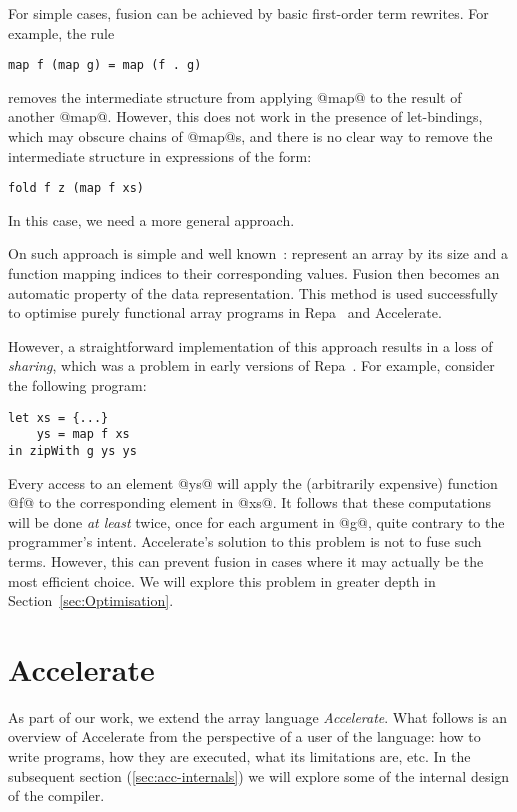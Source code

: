 For simple cases, fusion can be achieved by basic first-order term rewrites. For example, the rule
%
\begin{lstlisting}
map f (map g) = map (f . g)
\end{lstlisting}
%
removes the intermediate structure from applying @map@ to the result of another @map@. However, this does not work in the presence of let-bindings, which may obscure chains of @map@s, and there is no clear way to remove the intermediate structure in expressions of the form:
%
\begin{lstlisting}
fold f z (map f xs)
\end{lstlisting}
%
In this case, we need a more general approach.

On such approach is simple and well known~\cite{Claessen:obsidian-expressive,Guibas:1978jh,Elliott:2003ug}: represent an array by its size and a function mapping indices to their corresponding values. Fusion then becomes an automatic property of the data representation. This method is used successfully to optimise purely functional array programs in Repa~\cite{Keller:Repa,Lippmeier:Guiding} and Accelerate.

However, a straightforward implementation of this approach results in a loss of \emph{sharing}, which was a problem in early versions of Repa~\cite{Lippmeier:Guiding}. For example, consider the following program:
%
\begin{lstlisting}
let xs = {...}
    ys = map f xs
in zipWith g ys ys
\end{lstlisting}
%
Every access to an element @ys@ will apply the (arbitrarily expensive) function @f@ to the corresponding element in @xs@. It follows that these computations will be done \emph{at least} twice, once for each argument in @g@, quite contrary to the programmer's intent. Accelerate's solution to this problem is not to fuse such terms. However, this can prevent fusion in cases where it may actually be the most efficient choice. We will explore this problem in greater depth in Section~\ref{sec:Optimisation}.

\section{Accelerate}
\label{sec:background-accelerate}

As part of our work, we extend the array language \emph{Accelerate}. What follows is an overview of Accelerate from the perspective of a user of the language: how to write programs, how they are executed, what its limitations are, etc. In the subsequent section (\ref{sec:acc-internals}) we will explore some of the internal design of the compiler.

